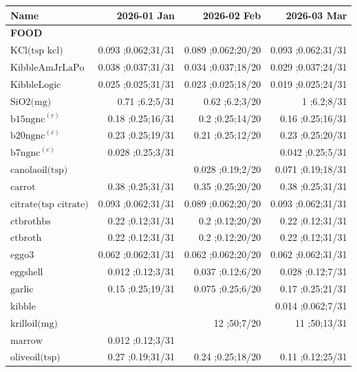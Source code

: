 \newcommand{\mjmdateminn}{2026-01-01}
\newcommand{\mjmdatemaxn}{2026-03-31}
\newcommand{\mjmsuperscriptsn}{{\bf a) } SMVT substrate. Biotin, Pantothenate, Lipoic Acid, and Iodine known to compete..{\bf c) } hamburger with varying fat percentages- 7,10,15,20, etc. ..}
\begin{table}[H]
\centering
\begin{tabular}{|l|r|r|r|}
\hline
Name&2026-01 Jan&2026-02 Feb&2026-03 Mar\\
\hline
{\bf FOOD}&&&\\
$\textrm{KCl(tsp~kcl)}$&0.093 ;0.062;31/31&0.089 ;0.062;20/20&0.093 ;0.062;31/31\\
$\textrm{KibbleAmJrLaPo}$&0.038 ;0.037;31/31&0.034 ;0.037;18/20&0.029 ;0.037;24/31\\
$\textrm{KibbleLogic}$&0.025 ;0.025;31/31&0.023 ;0.025;18/20&0.019 ;0.025;24/31\\
$\textrm{SiO2(mg)}$&0.71 ;6.2;5/31&0.62 ;6.2;3/20&1 ;6.2;8/31\\
$\textrm{b15ngnc}^{\left(c\right)}$&0.18 ;0.25;16/31&0.2 ;0.25;14/20&0.16 ;0.25;16/31\\
$\textrm{b20ngnc}^{\left(c\right)}$&0.23 ;0.25;19/31&0.21 ;0.25;12/20&0.23 ;0.25;20/31\\
$\textrm{b7ngnc}^{\left(c\right)}$&0.028 ;0.25;3/31&&0.042 ;0.25;5/31\\
$\textrm{canolaoil(tsp)}$&&0.028 ;0.19;2/20&0.071 ;0.19;18/31\\
$\textrm{carrot}$&0.38 ;0.25;31/31&0.35 ;0.25;20/20&0.38 ;0.25;31/31\\
$\textrm{citrate(tsp~citrate)}$&0.093 ;0.062;31/31&0.089 ;0.062;20/20&0.093 ;0.062;31/31\\
$\textrm{ctbrothbs}$&0.22 ;0.12;31/31&0.2 ;0.12;20/20&0.22 ;0.12;31/31\\
$\textrm{ctbroth}$&0.22 ;0.12;31/31&0.2 ;0.12;20/20&0.22 ;0.12;31/31\\
$\textrm{eggo3}$&0.062 ;0.062;31/31&0.062 ;0.062;20/20&0.062 ;0.062;31/31\\
$\textrm{eggshell}$&0.012 ;0.12;3/31&0.037 ;0.12;6/20&0.028 ;0.12;7/31\\
$\textrm{garlic}$&0.15 ;0.25;19/31&0.075 ;0.25;6/20&0.17 ;0.25;21/31\\
$\textrm{kibble}$&&&0.014 ;0.062;7/31\\
$\textrm{krilloil(mg)}$&&12 ;50;7/20&11 ;50;13/31\\
$\textrm{marrow}$&0.012 ;0.12;3/31&&\\
$\textrm{oliveoil(tsp)}$&0.27 ;0.19;31/31&0.24 ;0.25;18/20&0.11 ;0.12;25/31\\

\end{tabular}
\end{table}
